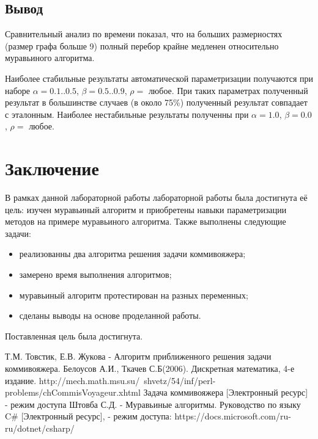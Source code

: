 \documentclass[12pt]{report}
\begin{document}
\section*{Вывод}
Сравнительный анализ по времени показал, что на больших размерностях (размер графа больше 9) полный перебор крайне медленен относительно муравьиного алгоритма.

Наиболее стабильные результаты автоматической параметризации получаются при наборе $\alpha = 0.1..0.5$, $\beta = 0.5..0.9$, $\rho = $ любое. При таких параметрах полученный результат в большинстве случаев (в около 75\%) полученный результат совпадает с эталонным. Наиболее нестабильные результаты полученны при $\alpha = 1.0$, $\beta = 0.0$, $\rho = $ любое.


\chapter*{Заключение}
В рамках данной лабораторной работы лабораторной работы была достигнута её цель: изучен муравьиный алгоритм и приобретены навыки параметризации методов на примере муравьиного алгоритма. Также выполнены следующие задачи:

\begin{itemize}
	\item реализованны два алгоритма решения задачи коммивояжера;
	\item замерено время выполнения алгоритмов;
	\item муравьиный алгоритм протестирован на разных переменных;
	\item сделаны выводы на основе проделанной работы.
\end{itemize}

Поставленная цель была достигнута.

\renewcommand\bibname{Список литературы}
 \begin{thebibliography}{3}
 	 Т.М. Товстик, Е.В. Жукова - Алгоритм приближенного решения задачи коммивояжера.
 	 Белоусов А.И., Ткачев С.Б(2006). Дискретная математика, 4-е издание.
 	http://mech.math.msu.su/~shvetz/54/inf/perl-problems/chCommisVoyageur.xhtml
 	 Задача коммивояжера [Электронный ресурс] - режим доступа
 	 Штовба С.Д. - Муравьиные алгоритмы.
	 Руководство по языку C\# [Электронный ресурс], - режим доступа: https://docs.microsoft.com/ru-ru/dotnet/csharp/
\end{thebibliography}
\end{document}
